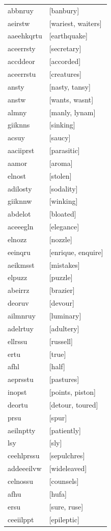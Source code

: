 \documentclass{article}
\begin{document}
\begin{tabular}{ll}
abbnruy & [banbury] \\
aeirstw & [wariest, waiters] \\
aaeehkqrtu & [earthquake] \\
aceerrsty & [secretary] \\
accddeor & [accorded] \\
aceerrstu & [creatures] \\
ansty & [nasty, tansy] \\
anstw & [wants, wasnt] \\
almny & [manly, lynam] \\
giiknns & [sinking] \\
acsuy & [saucy] \\
aaciiprst & [parasitic] \\
aamor & [aroma] \\
elnost & [stolen] \\
adilosty & [sodality] \\
giiknnw & [winking] \\
abdelot & [bloated] \\
aceeegln & [elegance] \\
elnozz & [nozzle] \\
eeinqru & [enrique, enquire] \\
aeikmsst & [mistakes] \\
elpuzz & [puzzle] \\
abeirrz & [brazier] \\
deoruv & [devour] \\
ailmnruy & [luminary] \\
adelrtuy & [adultery] \\
ellrssu & [russell] \\
ertu & [true] \\
afhl & [half] \\
aeprsstu & [pastures] \\
inopst & [points, piston] \\
deortu & [detour, toured] \\
prsu & [spur] \\
aeilnptty & [patiently] \\
lsy & [sly] \\
ceehlprssu & [sepulchres] \\
addeeeilvw & [wideleaved] \\
celnossu & [counsels] \\
afhu & [hufa] \\
ersu & [sure, ruse] \\
ceeiilppt & [epileptic] \\

\end{tabular}
\end{document}
